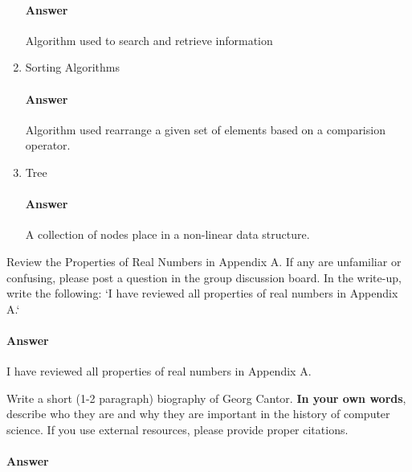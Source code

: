 \documentclass{article}
\begin{document}
\begin{enumerate}
        \paragraph{Answer}
        Algorithm used to search and retrieve information
    \item Sorting Algorithms
        \paragraph{Answer}
        Algorithm used rearrange a given set of elements based on a comparision operator.
    \item Tree
        \paragraph{Answer}
        A collection of nodes place in a non-linear data structure.
\end{enumerate}


Review the Properties of Real Numbers in Appendix A.  If any are unfamiliar or
confusing, please post a question in the group discussion board.  In the
write-up, write the following: `I have reviewed all properties of real numbers
in Appendix A.`

\paragraph{Answer}

I have reviewed all properties of real numbers in Appendix A.


Write a short (1-2 paragraph) biography of Georg Cantor.
\textbf{In your own words}, describe who they are and why they are important in
the history of computer science.  If you use external resources, please provide
proper citations.

\paragraph{Answer}
\end{document}
